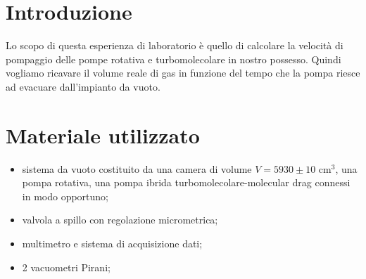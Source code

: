 \section{Introduzione}

Lo scopo di questa esperienza di laboratorio è quello di calcolare la velocità di pompaggio delle pompe rotativa e turbomolecolare in nostro possesso. Quindi vogliamo ricavare il volume reale di gas in funzione del tempo che la pompa riesce ad evacuare dall'impianto da vuoto.

\section{Materiale utilizzato}

\begin{itemize}
	\item{sistema da vuoto costituito da una camera di volume $V = 5930 \pm 10$ \si{\centi\metre}$^3$, una pompa rotativa, una pompa ibrida turbomolecolare-molecular drag connessi in modo opportuno;}
	\item{valvola a spillo con regolazione micrometrica;}
	\item{multimetro e sistema di acquisizione dati;}
	\item{2 vacuometri Pirani;}
\end{itemize}
